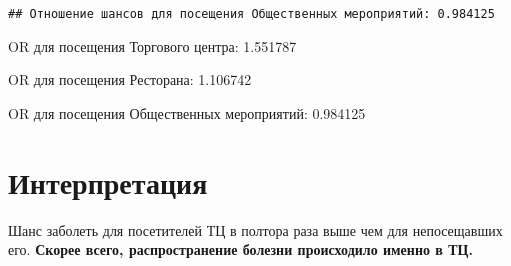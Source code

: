 \documentclass[
]{article}
\begin{document}
\begin{verbatim}
## Отношение шансов для посещения Общественных мероприятий: 0.984125
\end{verbatim}

OR для посещения Торгового центра: 1.551787

OR для посещения Ресторана: 1.106742

OR для посещения Общественных мероприятий: 0.984125

\section{Интерпретация}\label{ux438ux43dux442ux435ux440ux43fux440ux435ux442ux430ux446ux438ux44f}

Шанс заболеть для посетителей ТЦ в полтора раза выше чем для
непосещавших его. \textbf{Скорее всего, распространение болезни
происходило именно в ТЦ.}
\end{document}
